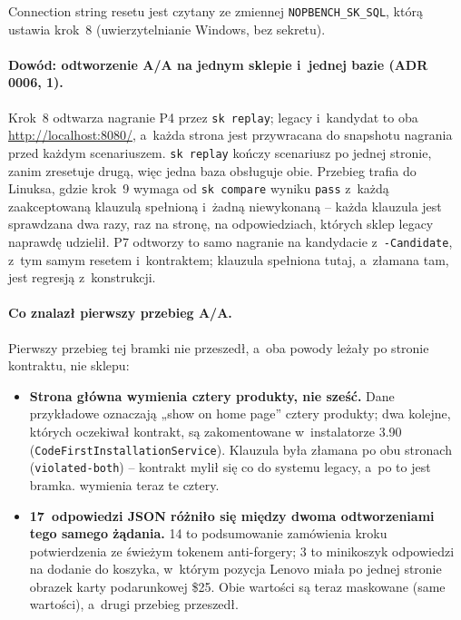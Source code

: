Connection string resetu jest czytany ze zmiennej \texttt{NOPBENCH\_SK\_SQL}, którą
ustawia krok~8 (uwierzytelnianie Windows, bez sekretu).

\paragraph{Dowód: odtworzenie A/A na jednym sklepie i~jednej bazie (ADR 0006, 1).}
Krok~8 odtwarza nagranie P4 przez \texttt{sk replay}; legacy i~kandydat to oba
\url{http://localhost:8080/}, a~każda strona jest przywracana do snapshotu nagrania przed
każdym scenariuszem. \texttt{sk replay} kończy scenariusz po jednej stronie, zanim
zresetuje drugą, więc jedna baza obsługuje obie. Przebieg trafia do Linuksa, gdzie
krok~9 wymaga od \texttt{sk compare} wyniku \texttt{pass} z~każdą zaakceptowaną klauzulą
spełnioną i~żadną niewykonaną -- każda klauzula jest sprawdzana dwa razy, raz na stronę,
na odpowiedziach, których sklep legacy naprawdę udzielił.  P7 odtworzy to
samo nagranie na kandydacie z~\texttt{-Candidate}, z~tym samym resetem i~kontraktem;
klauzula spełniona tutaj, a~złamana tam, jest regresją z~konstrukcji.

\paragraph{Co znalazł pierwszy przebieg A/A.} Pierwszy przebieg tej bramki nie przeszedł,
a~oba powody leżały po stronie kontraktu, nie sklepu:
\begin{itemize}
  \item \textbf{Strona główna wymienia cztery produkty, nie sześć.} Dane przykładowe
    oznaczają „show on home page” cztery produkty; dwa kolejne, których oczekiwał
    kontrakt, są zakomentowane w~instalatorze 3.90 (\texttt{CodeFirstInstallationService}).
    Klauzula była złamana po obu stronach (\texttt{violated-both}) -- kontrakt mylił się co
    do systemu legacy, a~po to jest bramka.
     wymienia teraz te cztery.
  \item \textbf{17~odpowiedzi JSON różniło się między dwoma odtworzeniami tego samego
    żądania.} 14 to podsumowanie zamówienia kroku potwierdzenia ze świeżym tokenem
    anti-forgery; 3 to minikoszyk odpowiedzi na dodanie do koszyka, w~którym pozycja
    Lenovo miała po jednej stronie obrazek karty podarunkowej \$25. Obie wartości są
    teraz maskowane (same wartości), a~drugi przebieg przeszedł.
\end{itemize}

